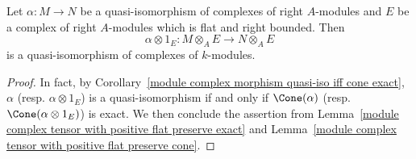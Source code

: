 \begin{proposition}\label{module complex tensor with positive quasi-iso}
Let $\alpha:M\to N$ be a quasi-isomorphism of complexes of right $A$-modules and $E$ be a complex of right $A$-modules which is flat and right bounded. Then
\[\alpha\otimes 1_E:M\otimes_AE\to N\otimes_AE\]
is a quasi-isomorphism of complexes of $k$-modules.
\end{proposition}
\begin{proof}
In fact, by Corollary~\ref{module complex morphism quasi-iso iff cone exact}, $\alpha$ (resp. $\alpha\otimes 1_E$) is a quasi-isomorphism if and only if $\Cone(\alpha)$ (resp. $\Cone(\alpha\otimes 1_E)$) is exact. We then conclude the assertion from Lemma~\ref{module complex tensor with positive flat preserve exact} and Lemma~\ref{module complex tensor with positive flat preserve cone}.
\end{proof}
